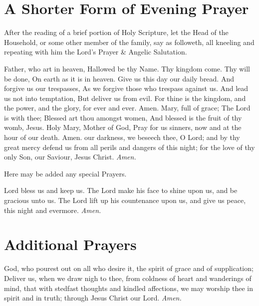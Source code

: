\section*{A Shorter Form of Evening Prayer}
\begin{secrubric}
    After the reading of a brief portion of Holy Scripture, let the Head of the Household, or some other member of the family, say as followeth, all kneeling and repeating with him the Lord's Prayer \& Angelic Salutation.
\end{secrubric}
 Father, who art in heaven, Hallowed be thy Name. Thy kingdom come. Thy will be done, On earth as it is in heaven. Give us this day our daily bread. And forgive us our trespasses, As we forgive those who trespass against us. And lead us not into temptation, But deliver us from evil. For thine is the kingdom, and the power, and the glory, for ever and ever. Amen.
 Mary, full of grace; The Lord is with thee; Blessed art thou amongst women, And blessed is the fruit of thy womb, Jesus. Holy Mary, Mother of God, Pray for us sinners, now and at the hour of our death. Amen.
 our darkness, we beseech thee, O Lord; and by thy great mercy defend us from all perils and dangers of this night; for the love of thy only Son, our Saviour, Jesus Christ. \textit{Amen.}

\begin{rubric}
    Here may be added any special Prayers.
\end{rubric}
 Lord bless us and keep us. The Lord make his face to shine upon us, and be gracious unto us. The Lord {} lift up his countenance upon us, and give us peace, this night and evermore. \textit{Amen.}

\section*{Additional Prayers}
 God, who pourest out on all who desire it, the spirit of grace and of supplication; Deliver us, when we draw nigh to thee, from coldness of heart and wanderings of mind, that with stedfast thoughts and kindled affections, we may worship thee in spirit and in truth; through Jesus Christ our Lord. \textit{Amen.}

